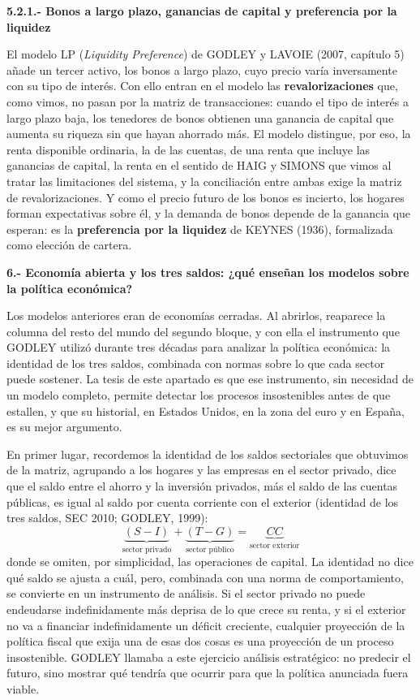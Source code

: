 \documentclass[10pt,a4paper]{article}
\begin{document}
\textbf{5.2.1.- Bonos a largo plazo, ganancias de capital y preferencia por la liquidez}

El modelo LP (\textit{Liquidity Preference}) de GODLEY y LAVOIE (2007, capítulo 5) añade un tercer activo, los bonos a largo plazo, cuyo precio varía inversamente con su tipo de interés. Con ello entran en el modelo las \textbf{revalorizaciones} que, como vimos, no pasan por la matriz de transacciones: cuando el tipo de interés a largo plazo baja, los tenedores de bonos obtienen una ganancia de capital que aumenta su riqueza sin que hayan ahorrado más. El modelo distingue, por eso, la renta disponible ordinaria, la de las cuentas, de una renta que incluye las ganancias de capital, la renta en el sentido de HAIG y SIMONS que vimos al tratar las limitaciones del sistema, y la conciliación entre ambas exige la matriz de revalorizaciones. Y como el precio futuro de los bonos es incierto, los hogares forman expectativas sobre él, y la demanda de bonos depende de la ganancia que esperan: es la \textbf{preferencia por la liquidez} de KEYNES (1936), formalizada como elección de cartera.

\textbf{6.- Economía abierta y los tres saldos: ¿qué enseñan los modelos sobre la política económica?}

Los modelos anteriores eran de economías cerradas. Al abrirlos, reaparece la columna del resto del mundo del segundo bloque, y con ella el instrumento que GODLEY utilizó durante tres décadas para analizar la política económica: la identidad de los tres saldos, combinada con normas sobre lo que cada sector puede sostener. La tesis de este apartado es que ese instrumento, sin necesidad de un modelo completo, permite detectar los procesos insostenibles antes de que estallen, y que su historial, en Estados Unidos, en la zona del euro y en España, es su mejor argumento.

En primer lugar, recordemos la identidad de los saldos sectoriales que obtuvimos de la matriz, agrupando a los hogares y las empresas en el sector privado, dice que el saldo entre el ahorro y la inversión privados, más el saldo de las cuentas públicas, es igual al saldo por cuenta corriente con el exterior (identidad de los tres saldos, SEC 2010; GODLEY, 1999):
$$\underbrace{(S-I)}_{\text{sector privado}}+\underbrace{(T-G)}_{\text{sector público}}=\underbrace{CC}_{\text{sector exterior}}$$
donde se omiten, por simplicidad, las operaciones de capital. La identidad no dice qué saldo se ajusta a cuál, pero, combinada con una norma de comportamiento, se convierte en un instrumento de análisis. Si el sector privado no puede endeudarse indefinidamente más deprisa de lo que crece su renta, y si el exterior no va a financiar indefinidamente un déficit creciente, cualquier proyección de la política fiscal que exija una de esas dos cosas es una proyección de un proceso insostenible. GODLEY llamaba a este ejercicio análisis estratégico: no predecir el futuro, sino mostrar qué tendría que ocurrir para que la política anunciada fuera viable.
\end{document}
